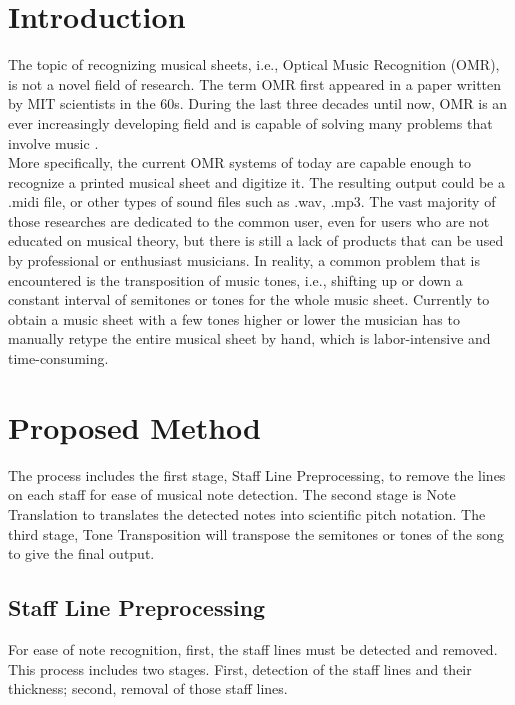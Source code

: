 \documentclass[a4paper,12pt]{report}
\begin{document}



\section{Introduction}

The topic of recognizing musical sheets, i.e., Optical Music Recognition (OMR),
is not a novel field of research. The term OMR first appeared in a paper written
by MIT scientists in the 60s.  During the last three decades until now, OMR is
an ever increasingly developing field and is capable of solving many problems
that involve music \cite{Shatri2020a}.\\

More specifically, the current OMR systems of today are capable enough to
recognize a printed musical sheet and digitize it. The resulting output could be
a .midi file, or other types of sound files such as .wav, .mp3. The vast
majority of those researches are dedicated to the common user, even for users
who are not educated on musical theory, but there is still a lack of products
that can be used by professional or enthusiast musicians. In reality, a common
problem that is encountered is the transposition of music tones, i.e., shifting up or down a constant interval of
semitones or tones for the whole music sheet. Currently to obtain a music
sheet with a few tones higher or lower the musician has to manually retype the
entire musical sheet by hand, which is labor-intensive and time-consuming.


\clearpage

\section{Proposed Method}
The process includes the first stage, Staff Line Preprocessing, to remove the
lines on each staff for ease of musical note detection. The second stage is Note
Translation to translates the detected notes into scientific pitch notation. The
third stage, Tone Transposition will transpose the semitones or tones of the
song to give the final output. 

\subsection{Staff Line Preprocessing}
For ease of note recognition, first, the staff lines must be detected and
removed. This process includes two stages. First, detection of the staff lines
and their thickness; second, removal of those staff lines.
\end{document}
